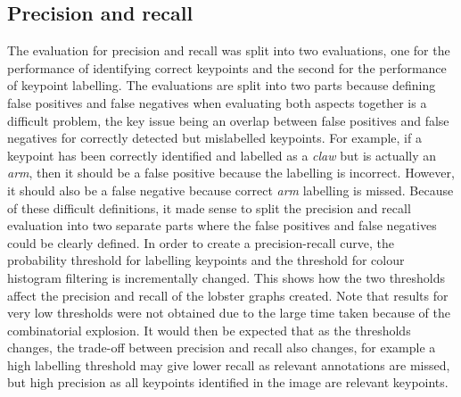 \subsection{Precision and recall}
The evaluation for precision and recall was split into two evaluations, one for the performance of identifying correct keypoints and the second for the performance of keypoint labelling. The evaluations are split into two parts because defining false positives and false negatives when evaluating both aspects together is a difficult problem, the key issue being an overlap between false positives and false negatives for correctly detected but mislabelled keypoints. For example, if a keypoint has been correctly identified and labelled as a \textit{claw} but is actually an \textit{arm}, then it should be a false positive because the labelling is incorrect. However, it should also be a false negative because correct \textit{arm} labelling is missed. Because of these difficult definitions, it made sense to split the precision and recall evaluation into two separate parts where the false positives and false negatives could be clearly defined.
\n
In order to create a precision-recall curve, the probability threshold for labelling keypoints and the threshold for colour histogram filtering is incrementally changed. This shows how the two thresholds affect the precision and recall of the lobster graphs created. Note that results for very low thresholds were not obtained due to the large time taken because of the combinatorial explosion. It would then be expected that as the thresholds changes, the trade-off between precision and recall also changes, for example a high labelling threshold may give lower recall as relevant annotations are missed, but high precision as all keypoints identified in the image are relevant keypoints.

